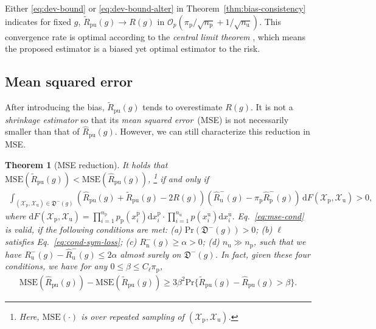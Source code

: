 \documentclass{article}
\newtheorem{theorem}{Theorem}
\newcommand{\dif}{\mathrm{d}}
\newcommand{\pr}{\mathrm{Pr}}
\newcommand{\mse}{\mathrm{MSE}}
\newcommand{\cO}{\mathcal{O}}
\newcommand{\cX}{\mathcal{X}}
\newcommand{\fD}{\mathfrak{D}}
\newcommand{\prp}{p_\mathrm{p}}
\newcommand{\pip}{\pi_\mathrm{p}}
\newcommand{\Xp}{\cX_\mathrm{p}}
\newcommand{\Xu}{\cX_\mathrm{u}}
\newcommand{\xp}{x^\mathrm{p}}
\newcommand{\xu}{x^\mathrm{u}}
\newcommand{\Np}{{n_\mathrm{p}}}
\newcommand{\Nu}{{n_\mathrm{u}}}
\newcommand{\Rn}{R_\mathrm{n}}
\newcommand{\Ru}{R_\mathrm{u}}
\newcommand{\hRp}{\widehat{R}_\mathrm{p}}
\newcommand{\hRu}{\widehat{R}_\mathrm{u}}
\newcommand{\hRpu}{\widehat{R}_\mathrm{pu}}
\newcommand{\tRpu}{\widetilde{R}_\mathrm{pu}}
\begin{document}
Either \eqref{eq:dev-bound} or \eqref{eq:dev-bound-alter} in Theorem~\ref{thm:bias-consistency} indicates for fixed $g$, $\tRpu(g)\to R(g)$ in $\cO_p(\pip/\sqrt{\Np}+1/\sqrt{\Nu})$.
This convergence rate is optimal according to the \emph{central limit theorem} \citep{chung68CPT}, which means the proposed estimator is a biased yet optimal estimator to the risk.

\subsection{Mean squared error}%

After introducing the bias, $\tRpu(g)$ tends to overestimate $R(g)$. It is not a \emph{shrinkage estimator} \citep{stein56bsmsp,james61bsmsp} so that its \emph{mean squared error}~(MSE) is not necessarily smaller than that of $\hRpu(g)$. However, we can still characterize this reduction in MSE.

\begin{theorem}[MSE reduction]
  \label{thm:mse}%
  It holds that $\mse(\tRpu(g))<\mse(\hRpu(g))$,%
  \footnote{Here, $\mse(\cdot)$ is over repeated sampling of $(\Xp,\Xu)$.}
  if and only if
  \begin{align}
  \label{eq:mse-cond}%
  \int_{(\Xp,\Xu)\in\fD^-(g)}(\hRpu(g)+\tRpu(g)-2R(g))
  (\hRu^-(g)-\pip\hRp^-(g))\,\dif F(\Xp,\Xu) > 0,
  \end{align}
  where $\dif F(\Xp,\Xu)=\prod_{i=1}^\Np\prp(\xp_i)\dif\xp_i\cdot\prod_{i=1}^\Nu p(\xu_i)\dif\xu_i$.
  Eq.~\eqref{eq:mse-cond} is valid, if the following conditions are met:
  (a) $\pr(\fD^-(g))>0$;
  (b) $\ell$ satisfies Eq.~\eqref{eq:cond-sym-loss};
  (c) $\Rn^-(g)\ge\alpha>0$;
  (d) $\Nu\gg\Np$, such that we have $\Ru^-(g)-\hRu^-(g)\le2\alpha$ almost surely on $\fD^-(g)$.
  In fact, given these four conditions, we have for any $0\le\beta\le C_\ell\pip$,
  \begin{align}
  \label{eq:mse-bound}%
  \mse(\hRpu(g))-\mse(\tRpu(g))
  \ge 3\beta^2\pr\{\tRpu(g)-\hRpu(g)>\beta\}.
  \end{align}
\end{theorem}
\end{document}
